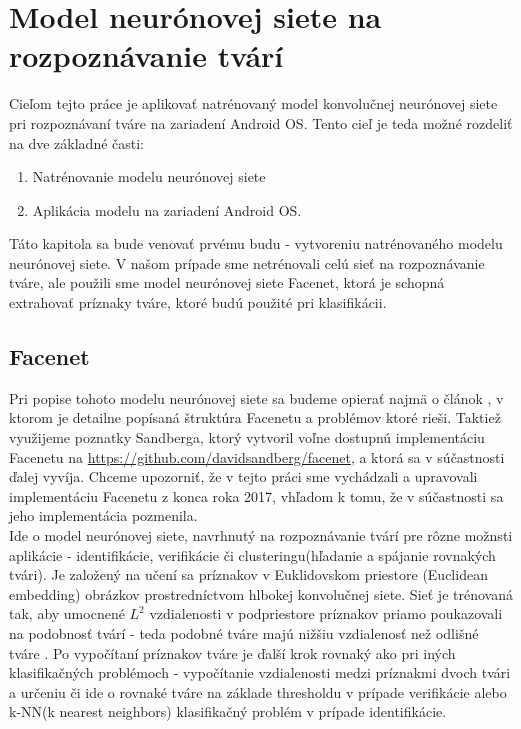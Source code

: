 \newpage 

\section{Model neurónovej siete na rozpoznávanie tvárí}\label{l:fcnt}
Cieľom tejto práce je aplikovať natrénovaný model konvolučnej neurónovej siete pri rozpoznávaní tváre na zariadení Android OS.
Tento cieľ je teda možné rozdeliť na dve základné časti:
\begin{enumerate}
	\item Natrénovanie modelu neurónovej siete
	\item Aplikácia modelu na zariadení Android OS.
\end{enumerate}

Táto kapitola sa bude venovať prvému budu - vytvoreniu natrénovaného modelu neurónovej siete.
V našom prípade sme netrénovali celú sieť na rozpoznávanie tváre, ale použili sme model neurónovej siete Facenet, ktorá je schopná extrahovať príznaky tváre, 
ktoré budú použité pri klasifikácii.

\subsection{Facenet}
Pri popise tohoto modelu neurónovej siete sa budeme opierať najmä o článok \cite{schroff2015facenet},
v ktorom je detailne popísaná štruktúra Facenetu a problémov ktoré rieši.
Taktiež využijeme poznatky Sandberga, ktorý vytvoril voľne dostupnú implementáciu Facenetu na \url{https://github.com/davidsandberg/facenet}, a ktorá sa v súčastnosti ďalej vyvíja.
Chceme upozorniť, že v tejto práci sme vychádzali a upravovali implementáciu Facenetu z konca roka 2017, vhľadom k tomu, že v súčastnosti sa jeho implementácia pozmenila.\\
 
\indent Ide o model neurónovej siete, navrhnutý na rozpoznávanie tvárí pre rôzne možnsti aplikácie - identifikácie, verifikácie či clusteringu(hľadanie a spájanie rovnakých tvári).
Je založený na učení sa príznakov v Euklidovskom priestore (Euclidean embedding) obrázkov prostredníctvom hlbokej konvolučnej siete.
Sieť je trénovaná tak, aby umocnené $ L^2 $ vzdialenosti v podpriestore príznakov priamo poukazovali na podobnosť tvárí - teda podobné tváre majú nižšiu vzdialenosť než odlišné tváre \cite{schroff2015facenet}.
Po vypočítaní príznakov tváre je ďalší krok rovnaký ako pri iných klasifikačných problémoch - vypočítanie vzdialenosti medzi príznakmi dvoch tvári a určeniu či ide o rovnaké tváre na základe thresholdu v prípade verifikácie alebo k-NN(k nearest neighbors) klasifikačný problém v prípade identifikácie.\\

